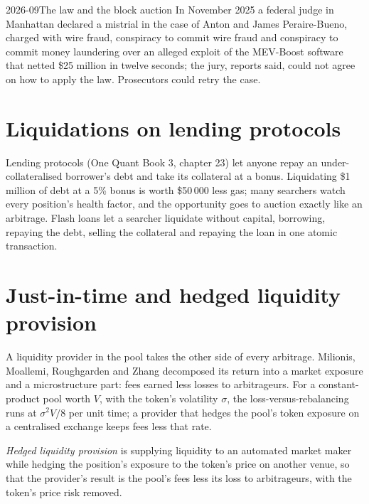 \begin{dated}{2026-09}{The law and the block auction}\label{dat:hf:on-chain-trading:law}
In November 2025 a federal judge in Manhattan declared a mistrial in the case of Anton and James Peraire-Bueno, charged with wire fraud,
conspiracy to commit wire fraud and conspiracy to commit money laundering over an alleged exploit of the MEV-Boost software that netted \$25 million
in twelve seconds; the jury, reports said, could not agree on how to apply the law. Prosecutors could retry the case.
\end{dated}

\section{Liquidations on lending protocols}

Lending protocols (One Quant Book 3, chapter 23) let anyone repay an under-collateralised borrower's debt and take its collateral at a bonus.
Liquidating \$1 million of debt at a 5\% bonus is worth \$50\,000 less gas; many searchers watch every position's health factor, and the
opportunity goes to auction exactly like an arbitrage. Flash loans let a searcher liquidate without capital, borrowing, repaying the debt, selling
the collateral and repaying the loan in one atomic transaction.

\section{Just-in-time and hedged liquidity provision}

A liquidity provider in the pool takes the other side of every arbitrage. Milionis, Moallemi, Roughgarden and Zhang decomposed its return into a
market exposure and a microstructure part: fees earned less losses to arbitrageurs. For a constant-product pool worth $V$, with the token's
volatility $\sigma$, the loss-versus-rebalancing runs at $\sigma^2V/8$ per unit time; a provider that hedges the pool's token exposure on a
centralised exchange keeps fees less that rate.

\begin{definition}\label{def:hf:on-chain-trading:hedged}
\emph{Hedged liquidity provision} is supplying liquidity to an automated market maker while hedging the
position's exposure to the token's price on another venue, so that the provider's result is the pool's fees less its loss to arbitrageurs, with
the token's price risk removed.
\end{definition}

